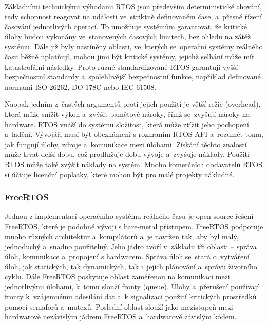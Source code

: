Základními technickými výhodami RTOS jsou především deterministické chování, tedy schopnost reagovat na události ve~striktně definovaném čase, a~přesné řízení časování jednotlivých operací. To umožňuje systémům garantovat, že kritické úlohy budou vykonány ve~stanovených časových limitech, bez ohledu na zátěž systému. Dále již byly nastíněny oblasti, ve~kterých se~operační systémy reálného času běžně uplatňují, mohou jimi být kritické systémy, jejichž selhání může mít katastrofální následky. Proto různé standardizované RTOS garantují vyšší bezpečnostní standardy a~spolehlivější bezpečnostní funkce, například definované normami ISO 26262, DO-178C nebo IEC 61508.~\cite{freertos_safertos}

Naopak jedním z~častých argumentů proti jejich použití je větší režie (overhead), která může snížit výkon a~zvýšit paměťové nároky, čímž se~zvyšují nároky na hardware. RTOS vnáší do systému složitost, která může ztížit jeho pochopení a~ladění. Vývojáři musí být obeznámeni s rozhraním RTOS API a~rozumět tomu, jak fungují úlohy, zdroje a~komunikace mezi úlohami. Získání těchto znalostí může trvat delší dobu, což prodlužuje dobu vývoje a~zvyšuje náklady. Použití RTOS může také zvýšit náklady na systém. Mnoho komerčních dodavatelů RTOS si účtuje licenční poplatky, které mohou být pro malé projekty nákladné.~\cite{sysgo_baremetal_vs_rtos}

\subsubsection{FreeRTOS}
Jednou z implementací operačního systému reálného času je open-source řešení FreeRTOS, které je podobné vývoji s bare-metal přístupem. FreeRTOS podporuje mnoho různých architektur a~kompilátorů a~je navržen tak, aby byl malý, jednoduchý a~snadno použitelný. Jeho jádro tvoří v~základu tři oblasti -- správa úloh, komunikace a~propojení s hardwarem. Správa úloh se~stará o~vytváření úloh, jak statických, tak dynamických, tak i~jejich plánování a~správu životního cyklu. Dále FreeRTOS poskytuje oblast zaměřenou na komunikaci mezi jednotlivými úlohami, k~tomu slouží fronty (queue). Úlohy a~přerušení používají fronty k~vzájemnému odesílání dat a~k signalizaci použití kritických prostředků pomocí semaforů a~mutexů. Poslední oblast slouží jako mezistupeň mezi hardwarově nezávislým jádrem FreeRTOS a~hardwarově závislým kódem.~\cite{the_architecture_of_open_source_applications}

